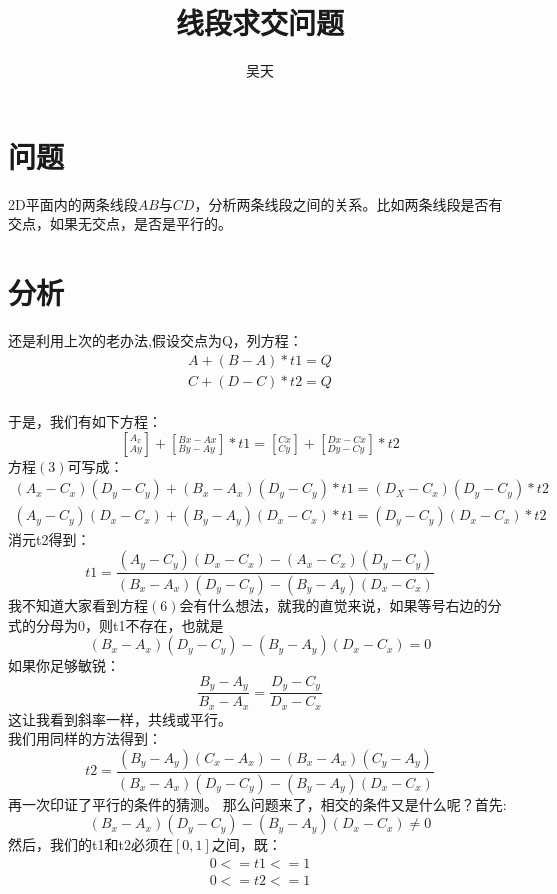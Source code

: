 \documentclass[UTF8,12pt]{article}
\title{线段求交问题}
\author{吴天}
\begin{document}
\maketitle
\section{问题}
	2D平面内的两条线段$AB$与$CD$，分析两条线段之间的关系。比如两条线段是否有交点，如果无交点，是否是平行的。
	
\section{分析}
	还是利用上次的老办法,假设交点为Q，列方程：
	\begin{eqnarray}
	A+(B-A) * t1 = Q \\
	C+(D-C) * t2 = Q
	\end{eqnarray}\\
	于是，我们有如下方程：
	\begin{equation}
	\left[^{A_x}_{Ay}\right] + \left[^{Bx-Ax}_{By-Ay}\right] * t1 = 	\left[^{Cx}_{Cy}\right] +  \left[^{Dx-Cx}_{Dy-Cy}\right] * t2
	\end{equation}
	方程$(3)$可写成：
	\begin{eqnarray}
		(A_x - C_x)(D_y - C_y)+(B_x -A_x)(D_y-C_y)*t1 = (D_X - C_x)(D_y - C_y)*t2\\
		(A_y-C_y)(D_x-C_x) +(B_y-A_y)(D_x-C_x) * t1 = (D_y-C_y)(D_x-C_x) * t2
	\end{eqnarray}
	消元t2得到：
	\begin{equation}
	t1 = \frac{(A_y-C_y)(D_x-C_x) - (A_x-C_x)(D_y-C_y)}{(B_x-A_x)(D_y-C_y)-(B_y-A_y)(D_x-C_x)}
	\end{equation}
	我不知道大家看到方程$(6)$会有什么想法，就我的直觉来说，如果等号右边的分式的分母为0，则t1不存在，也就是$$(B_x-A_x)(D_y-C_y)-(B_y-A_y)(D_x-C_x)=0$$
	如果你足够敏锐：$$\frac{B_y-A_y}{B_x-A_x}=\frac{D_y-C_y}{D_x-C_x}$$
	这让我看到斜率一样，共线或平行。\\
	我们用同样的方法得到：
	\begin{equation}
	t2 = \frac{(B_y-A_y)(C_x-A_x) - (B_x-A_x)(C_y-A_y)}{(B_x-A_x)(D_y-C_y)-(B_y-A_y)(D_x-C_x)}
	\end{equation}
	再一次印证了平行的条件的猜测。
	那么问题来了，相交的条件又是什么呢？首先:
	$$(B_x-A_x)(D_y-C_y)-(B_y-A_y)(D_x-C_x)\neq0$$
	然后，我们的t1和t2必须在$\left[0,1\right]$之间，既：
	\begin{eqnarray}
	0<=t1<=1\\
	0<=t2<=1
	\end{eqnarray}
\end{document}
